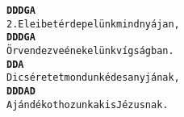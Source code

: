 \begin{minipage}{\textwidth}
\kottastart
{}
\kottaend
\begin{minipage}{\textwidth}
\begin{multicols}{2}
\begin{minipage}{\textwidth}
\begin{alltt}
\textbf{   D       D           D    G A}
2. Eleibe térdepelünk mindnyájan,
\textbf{   D          D          D  G  A}
   Örvendezve énekelünk vígságban.
\textbf{    D          D                A}
   Dicséretet mondunk édesanyjának,
\textbf{   D          D            D A  D}
   Ajándékot hozunk a kis Jézusnak.
\end{alltt}
\vspace{0.0cm}
\versszakspacing
\end{minipage}
\vspace{0.2cm}
\end{multicols}
\end{minipage}

\end{minipage}
~\vspace{1.0cm}
\newline
